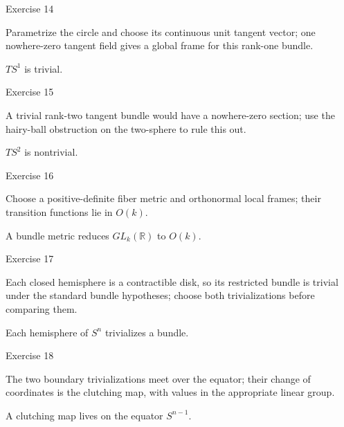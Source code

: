 \begin{exercise}\label{exr:viii30-14}
Exercise 14
\end{exercise}
\begin{hint}
Parametrize the circle and choose its continuous unit tangent vector; one nowhere-zero tangent field gives a global frame for this rank-one bundle.
\end{hint}
\begin{solution}
\(TS^1\) is trivial.
\end{solution}

\begin{exercise}\label{exr:viii30-15}
Exercise 15
\end{exercise}
\begin{hint}
A trivial rank-two tangent bundle would have a nowhere-zero section; use the hairy-ball obstruction on the two-sphere to rule this out.
\end{hint}
\begin{solution}
\(TS^2\) is nontrivial.
\end{solution}

\begin{exercise}\label{exr:viii30-16}
Exercise 16
\end{exercise}
\begin{hint}
Choose a positive-definite fiber metric and orthonormal local frames; their transition functions lie in \(O(k)\).
\end{hint}
\begin{solution}
A bundle metric reduces \(GL_k(\mathbb R)\) to \(O(k)\).
\end{solution}

\begin{exercise}\label{exr:viii30-17}
Exercise 17
\end{exercise}
\begin{hint}
Each closed hemisphere is a contractible disk, so its restricted bundle is trivial under the standard bundle hypotheses; choose both trivializations before comparing them.
\end{hint}
\begin{solution}
Each hemisphere of \(S^n\) trivializes a bundle.
\end{solution}

\begin{exercise}\label{exr:viii30-18}
Exercise 18
\end{exercise}
\begin{hint}
The two boundary trivializations meet over the equator; their change of coordinates is the clutching map, with values in the appropriate linear group.
\end{hint}
\begin{solution}
A clutching map lives on the equator \(S^{n-1}\).
\end{solution}

